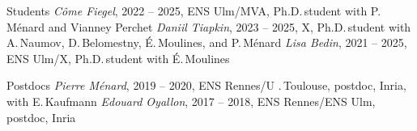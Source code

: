 \documentclass{resume}
\begin{document}
\begin{category}{Students}
\citembullet  \emph{C\^{o}me Fiegel}, 2022 -- 2025, ENS Ulm/MVA,  Ph.D.\,student with P.\,M\'enard and Vianney Perchet
\citembullet  \emph{Daniil Tiapkin}, 2023 -- 2025, X,  Ph.D.\,student with A.\,Naumov, D.\,Belomestny, \'E.\,Moulines, and P.\,M\'enard 
\citembullet  \emph{Lisa Bedin}, 2021 -- 2025, ENS Ulm/X,  Ph.D.\,student with \'E.\,Moulines
\end{category}

\begin{category}{Postdocs}
\citembullet \textit{Pierre M\'enard}, 2019 -- 2020,  ENS Rennes/U .\,Toulouse, postdoc, Inria, with E.\,Kaufmann 
\citembullet \textit{Edouard Oyallon}, 2017 -- 2018,  ENS Rennes/ENS Ulm, postdoc, Inria 
\end{category}
\end{document}
